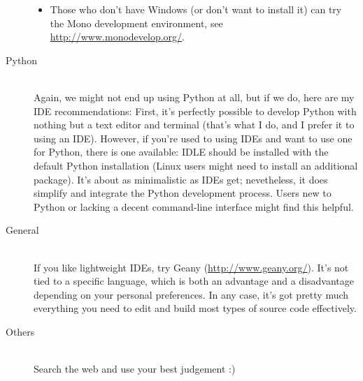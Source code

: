 \documentclass[12pt]{article}
\begin{document}
\begin{description}
\begin{itemize}
            \item Those who don't have Windows (or don't want to install it) can try the Mono development environment, see \url{http://www.monodevelop.org/}. 
        \end{itemize}
    \item[Python] \hfill \\
        Again, we might not end up using Python at all, but if we do, here are my IDE recommendations: First, it's perfectly possible to develop Python with nothing but a text editor and terminal (that's what I do, and I prefer it to using an IDE). However, if you're used to using IDEs and want to use one for Python, there is one available: IDLE should be installed with the default Python installation (Linux users might need to install an additional package). It's about as minimalistic as IDEs get; nevetheless, it does simplify and integrate the Python development process. Users new to Python or lacking a decent command-line interface might find this helpful.
    \item[General] \hfill \\
        If you like lightweight IDEs, try Geany (\url{http://www.geany.org/}). It's not tied to a specific language, which is both an advantage and a disadvantage depending on your personal preferences. In any case, it's got pretty much everything you need to edit and build most types of source code effectively.
    \item[Others] \hfill \\
        Search the web and use your best judgement :)
\end{description}

\end{document}
